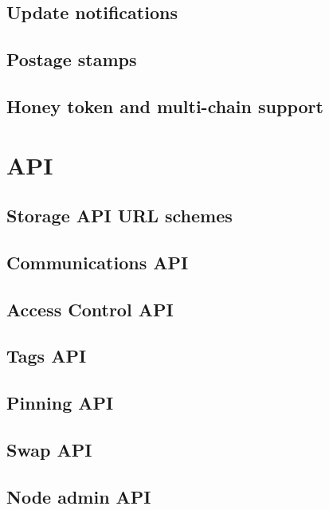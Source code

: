 \section{Update notifications}\label{spec:format:update-notifications}
%
\section{Postage stamps}\label{spec:format:postage-stamps}

\section{Honey token and multi-chain support}\label{spec:format:honey}
%

\chapter{API}
\section{Storage API URL schemes}\label{spec:api:storage}

\section{Communications API}\label{spec:api:communications}

\section{Access Control API}\label{spec:api:access-control}

\section{Tags API}\label{spec:api:tags}

\section{Pinning API}\label{spec:api:pinning}

\section{Swap API}\label{spec:api:swap}

\section{Node admin API}\label{spec:api:admin}



